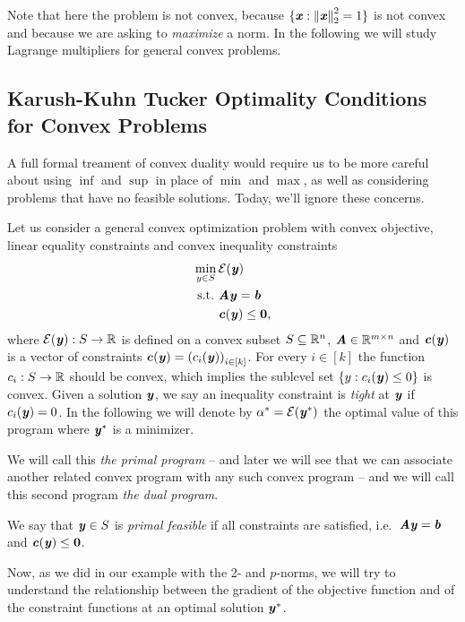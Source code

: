 Note that here the problem is not convex, because $\{ \boldsymbol{\mathit{x}}: \left\| \boldsymbol{\mathit{x}} \right\|_2^2 =
1 \}$ is not convex and because we are asking to \emph{maximize} a norm.
In the following we will study Lagrange multipliers for general convex
problems.

\subsection{Karush-Kuhn Tucker Optimality Conditions for Convex Problems}

A full formal treament of convex duality would require us to be more careful
about using $\inf$ and $\sup$ in place of $\min$ and $\max$, as well
as considering problems that have no feasible solutions.
Today, we'll ignore these concerns.

Let us consider a general convex optimization problem with convex objective, linear equality constraints and convex inequality constraints
\begin{align}
  \label{eq:primalprob}
     \min_{y \in S}{} & \mathcal{E}(\boldsymbol{\mathit{y}}) \\ \nonumber
\text{s.t.}\  & \boldsymbol{\mathit{A}}\boldsymbol{\mathit{y}} = \boldsymbol{\mathit{b}} \\ \nonumber
              & \boldsymbol{\mathit{c}}(\boldsymbol{\mathit{y}}) \leq \boldsymbol{0},
\end{align}
where $\mathcal{E}(\boldsymbol{\mathit{y}}): S \rightarrow \mathbb{R}$ is defined on a convex subset $S \subseteq \mathbb{R}^n$, $\boldsymbol{\mathit{A}} \in \mathbb{R}^{m\times n}$
and $\boldsymbol{\mathit{c}}(\boldsymbol{\mathit{y}})$ is a vector of constraints $\boldsymbol{\mathit{c}}(\boldsymbol{\mathit{y}}) = \left(c_i(\boldsymbol{\mathit{y}})\right)_{i \in [k]}$.
For every $i \in [k]$ the function $c_i: S \rightarrow \mathbb{R}$ should be convex,
which implies the sublevel set $\left\{y : c_i(\boldsymbol{\mathit{y}}) \leq 0  \right\}$ is
convex.
Given a solution $\boldsymbol{\mathit{y}}$, we say an inequality constraint is
\emph{tight} at $\boldsymbol{\mathit{y}}$ if $c_i(\boldsymbol{\mathit{y}}) = 0$.
In the following we will denote by $\alpha^* = \mathcal{E}(\boldsymbol{\mathit{y}}^*)$ the optimal value of this program where $\boldsymbol{\mathit{y}}^*$ is a minimizer.

We will call this \emph{the primal program} -- and later we will see
that we can associate another related convex program with any such
convex program -- and we will call this second program \emph{the dual program}.

\begin{definition}
We say that $\boldsymbol{\mathit{y}} \in S$ is \emph{primal feasible} if all constraints are satisfied, i.e.~$\boldsymbol{\mathit{A}}\boldsymbol{\mathit{y}} = \boldsymbol{\mathit{b}}$ and $\boldsymbol{\mathit{c}}(\boldsymbol{\mathit{y}}) \leq \boldsymbol{0}$.
\end{definition}

Now, as we did in our example with the 2- and $p$-norms, we will try
to understand the relationship between the gradient of the objective
function and of the constraint functions at an optimal solution $\boldsymbol{\mathit{y}}^*$.

